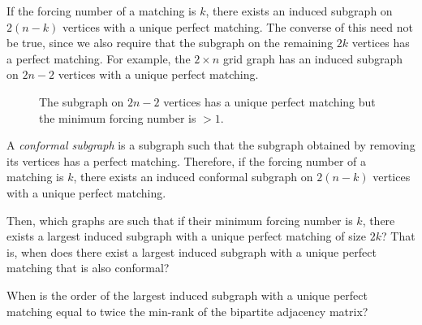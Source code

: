 	If the forcing number of a matching is $k$, there exists an induced subgraph on $2(n-k)$ vertices with a unique perfect matching. The converse of this need not be true, since we also require that the subgraph on the remaining $2k$ vertices has a perfect matching. For example, the $2 \times n$ grid graph has an induced subgraph on $2n-2$ vertices with a unique perfect matching.

	\begin{figure}[H]
		\centering
	\caption{The subgraph on $2n-2$ vertices has a unique perfect matching but the minimum forcing number is $>1$.} 
	\end{figure}

	A \emph{conformal subgraph} is a subgraph such that the subgraph obtained by removing its vertices has a perfect matching. Therefore, if the forcing number of a matching is $k$, there exists an induced conformal subgraph on $2(n-k)$ vertices with a unique perfect matching.

	\begin{question}
		Then, which graphs are such that if their minimum forcing number is $k$, there exists a largest induced subgraph with a unique perfect matching of size $2k$? That is, when does there exist a largest induced subgraph with a unique perfect matching that is also conformal?
	\end{question}

	\begin{question}
		When is the order of the largest induced subgraph with a unique perfect matching equal to twice the min-rank of the bipartite adjacency matrix?
	\end{question}

